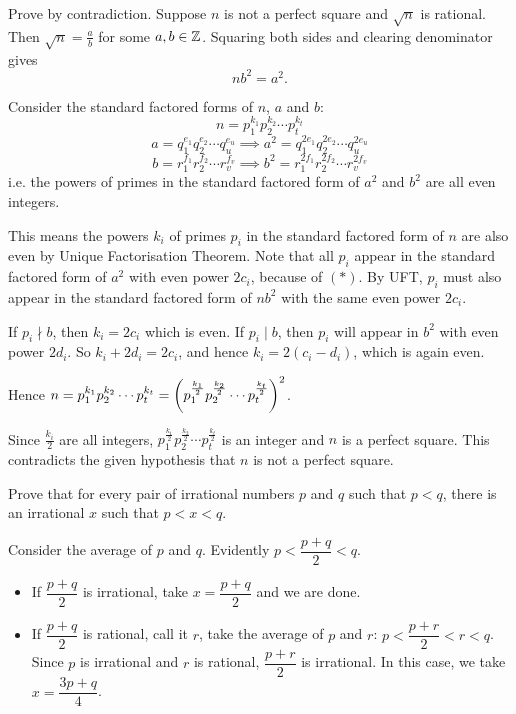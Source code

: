 \begin{solution}
Prove by contradiction. Suppose $n$ is not a perfect square and $\sqrt{n}$ is rational. Then $\sqrt{n}=\frac{a}{b}$ for some $a,b\in\mathbb Z$. Squaring both sides and clearing denominator gives 
\begin{equation*}\tag{$\ast$}
nb^2=a^2.
\end{equation*}

Consider the standard factored forms of $n$, $a$ and $b$:
\[ n=p_1^{k_1}p_2^{k_2}\cdots p_t^{k_t} \]
\[ a=q_1^{e_1}q_2^{e_2}\cdots q_u^{e_u} \implies a^2=q_1^{2e_1}q_2^{2e_2}\cdots q_u^{2e_u} \]
\[ b=r_1^{f_1}r_2^{f_2}\cdots r_v^{f_v} \implies b^2=r_1^{2f_1}r_2^{2f_2}\cdots r_v^{2f_v} \]
i.e. the powers of primes in the standard factored form of $a^2$ and $b^2$ are all even integers. 

This means the powers $k_i$ of primes $p_i$ in the standard factored form of $n$ are also even by Unique Factorisation Theorem. Note that all $p_i$ appear in the standard factored form of $a^2$ with even power $2c_i$, because of $(\ast)$. By UFT, $p_i$ must also appear in the standard factored form of $nb^2$ with the same even power $2c_i$.

If $p_i\nmid b$, then $k_i=2c_i$ which is even. If $p_i\mid b$, then $p_i$ will appear in $b^2$ with even power $2d_i$. So $k_i+2d_i=2c_i$, and hence $k_i=2(c_i-d_i)$, which is again even.

Hence $n=p_1^{k_1}p_2^{k_2}\cdots p_t^{k_t}=\left(p_1^{\frac{k_1}{2}}p_2^{\frac{k_2}{2}}\cdots p_t^{\frac{k_t}{2}}\right)^2$.

Since $\frac{k_i}{2}$ are all integers, $p_1^{\frac{k_1}{2}}p_2^{\frac{k_2}{2}}\cdots p_t^{\frac{k_t}{2}}$ is an integer and $n$ is a perfect square. This contradicts the given hypothesis that $n$ is not a perfect square.
\end{solution}

\begin{exercise}
Prove that for every pair of irrational numbers $p$ and $q$ such that $p<q$, there is an irrational $x$ such that $p<x<q$.
\end{exercise}

\begin{solution}
Consider the average of $p$ and $q$. Evidently $p<\dfrac{p+q}{2}<q$.
\begin{itemize}
\item If $\dfrac{p+q}{2}$ is irrational, take $x=\dfrac{p+q}{2}$ and we are done.
\item If $\dfrac{p+q}{2}$ is rational, call it $r$, take the average of $p$ and $r$: $p<\dfrac{p+r}{2}<r<q$. Since $p$ is irrational and $r$ is rational, $\dfrac{p+r}{2}$ is irrational. In this case, we take $x=\dfrac{3p+q}{4}$.
\end{itemize}
\end{solution}

